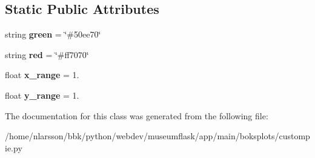 \subsection*{Static Public Attributes}
\begin{DoxyCompactItemize}
\item 
\mbox{\label{classboksplots_1_1custompie_1_1CustomPieBuilder_a3c5ad7ae1db4b77ac44c7a3c85416eb2}} 
string {\bfseries green} = \char`\"{}\#50ee70\char`\"{}
\item 
\mbox{\label{classboksplots_1_1custompie_1_1CustomPieBuilder_a4ac12bab12bf0961df2e92693d790597}} 
string {\bfseries red} = \char`\"{}\#ff7070\char`\"{}
\item 
\mbox{\label{classboksplots_1_1custompie_1_1CustomPieBuilder_af18e2919841eaddf14f8eb0178cfbd1d}} 
float {\bfseries x\+\_\+range} = 1.
\item 
\mbox{\label{classboksplots_1_1custompie_1_1CustomPieBuilder_a4d5da6a2cc64696d97dd3eec987acf0e}} 
float {\bfseries y\+\_\+range} = 1.
\end{DoxyCompactItemize}


The documentation for this class was generated from the following file\+:\begin{DoxyCompactItemize}
\item 
/home/nlarsson/bbk/python/webdev/museumflask/app/main/boksplots/custompie.\+py\end{DoxyCompactItemize}
